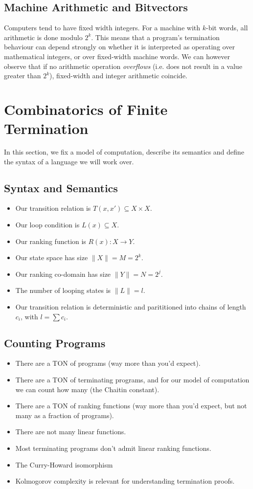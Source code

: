 \documentclass[preprint]{sigplanconf}
\theoremstyle{definition}
\begin{document}
\subsection{Machine Arithmetic and Bitvectors} \label{sec:machine.arith} 
Computers tend to have fixed width integers.  For a machine with $k$-bit words,
all arithmetic is done modulo $2^k$.  This means that a program's termination
behaviour can depend strongly on whether it is interpreted as operating over
mathematical integers, or over fixed-width machine words.  We can however
observe that if no arithmetic operation \emph{overflows} (i.e. does not result
in a value greater than $2^k$), fixed-width and integer arithmetic coincide.

\section{Combinatorics of Finite Termination}
In this section, we fix a model of computation, describe its semantics and
define the syntax of a language we will work over.

\subsection{Syntax and Semantics}

\begin{itemize}
 \item Our transition relation is $T(x, x') \subseteq X \times X$.
 \item Our loop condition is $L(x) \subseteq X$.
 \item Our ranking function is $R(x) : X \to Y$.
 \item Our state space has size $\| X \| = M = 2^k$.
 \item Our ranking co-domain has size $\| Y \| = N = 2^j$.
 \item The number of looping states is $\| L \| = l$.
 \item Our transition relation is deterministic and parititioned into chains of length $c_i$, with $l = \sum c_i$.
\end{itemize}

\subsection{Counting Programs}
\begin{itemize}
 \item There are a TON of programs (way more than you'd expect).
 \item There are a TON of terminating programs, and for our model of computation we can count
  how many (the Chaitin constant).
 \item There are a TON of ranking functions (way more than you'd expect, but not many as a
  fraction of programs).
 \item There are not many linear functions.
 \item Most terminating programs don't admit linear ranking functions.
 \item The Curry-Howard isomorphism
 \item Kolmogorov complexity is relevant for understanding termination proofs.
\end{itemize}
\end{document}

